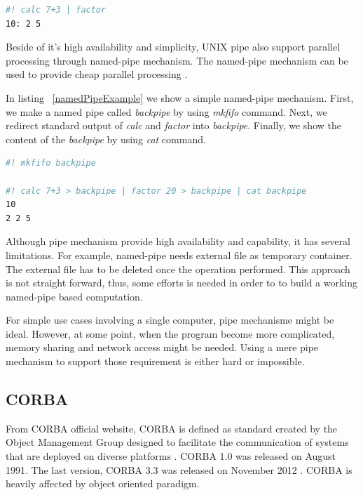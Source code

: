 \documentclass[conference]{IEEEtran}
\begin{document}
\begin{lstlisting}[caption=Unnamed pipe example, label=unnamedPipeExample, language=bash, basicstyle=\small, breaklines=true]
#! calc 7+3 | factor
10: 2 5
\end{lstlisting}


Beside of it's high availability and simplicity, UNIX pipe also support parallel
processing through named-pipe mechanism. The named-pipe mechanism can be used to 
provide cheap parallel processing \cite{conway2003parallel}. 

In listing ~\ref{namedPipeExample} we show a simple named-pipe mechanism. First, we make
a named pipe called {\it backpipe} by using {\it mkfifo} command. Next, we redirect
standard output of {\it calc} and {\it factor} into {\it backpipe}. Finally, we show
the content of the {\it backpipe} by using {\it cat} command.

\begin{lstlisting}[caption=Named pipe example, label=namedPipeExample, language=bash, basicstyle=\small, breaklines=true]
#! mkfifo backpipe 

#! calc 7+3 > backpipe | factor 20 > backpipe | cat backpipe
10
2 2 5
\end{lstlisting}

Although pipe mechanism provide high availability and capability, 
it has several limitations. For example, named-pipe needs external file as temporary 
container. The external file has to be deleted once the operation performed. 
This approach is not straight forward, thus, some efforts is needed in order to 
to build a working named-pipe based computation. 

For simple use cases involving a single computer, pipe mechanisme might be ideal. 
However, at some point, when the program become more complicated, memory sharing 
and network access might be needed. Using a mere pipe mechanism to support those 
requirement is either hard or impossible.

\subsection{CORBA}

From CORBA official website, CORBA is defined as standard created by the Object 
Management Group designed to facilitate the communication of systems 
that are deployed on diverse platforms \cite{corba}. CORBA 1.0 was released on August 
1991. The last version, CORBA 3.3 was released on November 2012 \cite{corbaspec}.
CORBA is heavily affected by object oriented paradigm.
\end{document}
